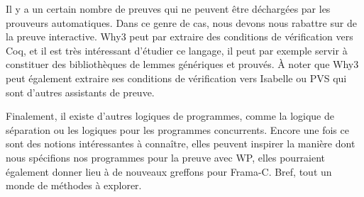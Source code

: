 Il y a un certain nombre de preuves qui ne peuvent être déchargées par les
prouveurs automatiques. Dans ce genre de cas, nous devons nous rabattre sur de
la preuve interactive. Why3 peut par extraire des conditions de vérification
vers Coq, et il est très intéressant d'étudier ce langage, il peut par exemple
servir à constituer des bibliothèques de lemmes génériques et prouvés. À noter
que Why3 peut également extraire ses conditions de vérification vers Isabelle ou
PVS qui sont d'autres assistants de preuve.



Finalement, il existe d'autres logiques de programmes, comme la logique de
séparation ou les logiques pour les programmes concurrents. Encore une fois ce
sont des notions intéressantes à connaître, elles peuvent inspirer la manière dont
nous spécifions nos programmes pour la preuve avec WP, elles pourraient également
donner lieu à de nouveaux greffons pour Frama-C. Bref, tout un monde de méthodes à
explorer.
